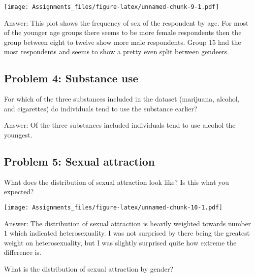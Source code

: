 \documentclass[
]{article}
\newenvironment{Shaded}{\begin{snugshade}}{\end{snugshade}}
\newcommand{\DataTypeTok}[1]{\textcolor[rgb]{0.13,0.29,0.53}{#1}}
\newcommand{\KeywordTok}[1]{\textcolor[rgb]{0.13,0.29,0.53}{\textbf{#1}}}
\newcommand{\NormalTok}[1]{#1}
\newcommand{\OperatorTok}[1]{\textcolor[rgb]{0.81,0.36,0.00}{\textbf{#1}}}
\newcommand{\OtherTok}[1]{\textcolor[rgb]{0.56,0.35,0.01}{#1}}
\newcommand{\StringTok}[1]{\textcolor[rgb]{0.31,0.60,0.02}{#1}}
\begin{document}
\texttt{[image: Assignments\_files/figure-latex/unnamed-chunk-9-1.pdf]}

Answer: This plot shows the frequency of sex of the respondent by age.
For most of the younger age groups there seems to be more female
respondents then the group between eight to twelve show more male
respondents. Group 15 had the most respondents and seems to show a
pretty even split between gendeers.

\hypertarget{problem-4-substance-use}{%
\subsection{Problem 4: Substance use}\label{problem-4-substance-use}}

For which of the three substances included in the dataset (marijuana,
alcohol, and cigarettes) do individuals tend to use the substance
earlier?

Answer: Of the three substances included individuals tend to use alcohol
the youngest.

\hypertarget{problem-5-sexual-attraction}{%
\subsection{Problem 5: Sexual
attraction}\label{problem-5-sexual-attraction}}

What does the distribution of sexual attraction look like? Is this what
you expected?

\begin{Shaded}
\end{Shaded}

\texttt{[image: Assignments\_files/figure-latex/unnamed-chunk-10-1.pdf]}

Answer: The distribution of sexual attraction is heavily weighted
towards number 1 which indicated heterosexuality. I was not surprised by
there being the greatest weight on heterosexuality, but I was slightly
surprised quite how extreme the difference is.

What is the distribution of sexual attraction by gender?

\begin{Shaded}
\end{Shaded}
\end{document}
